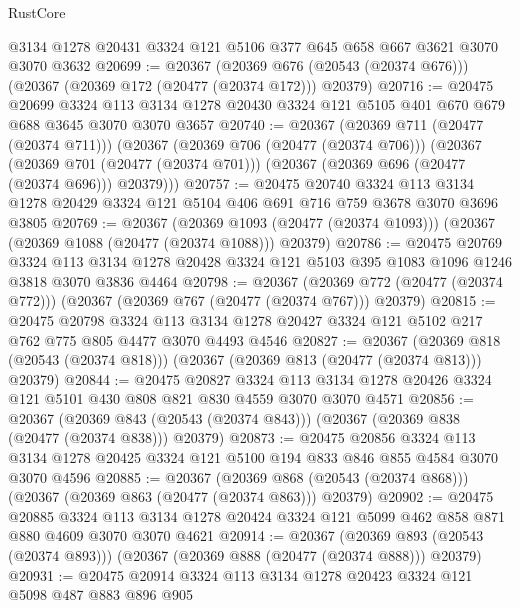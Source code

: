 \begin{lexlean}{RustCore}
\begin{coremodule}
    @3134
    @1278
    @20431
    @3324
    @121
    @5106
    @377
    @645
    @658
    @667
    @3621
    @3070
    @3070
    @3632
@20699 := @20367
    (@20369 @676 (@20543 (@20374 @676)))
    (@20367 (@20369 @172 (@20477 (@20374 @172))) @20379)
@20716 := @20475
    @20699
    @3324
    @113
    @3134
    @1278
    @20430
    @3324
    @121
    @5105
    @401
    @670
    @679
    @688
    @3645
    @3070
    @3070
    @3657
@20740 := @20367
    (@20369 @711 (@20477 (@20374 @711)))
    (@20367
      (@20369 @706 (@20477 (@20374 @706)))
      (@20367
        (@20369 @701 (@20477 (@20374 @701)))
        (@20367 (@20369 @696 (@20477 (@20374 @696))) @20379)))
@20757 := @20475
    @20740
    @3324
    @113
    @3134
    @1278
    @20429
    @3324
    @121
    @5104
    @406
    @691
    @716
    @759
    @3678
    @3070
    @3696
    @3805
@20769 := @20367
    (@20369 @1093 (@20477 (@20374 @1093)))
    (@20367 (@20369 @1088 (@20477 (@20374 @1088))) @20379)
@20786 := @20475
    @20769
    @3324
    @113
    @3134
    @1278
    @20428
    @3324
    @121
    @5103
    @395
    @1083
    @1096
    @1246
    @3818
    @3070
    @3836
    @4464
@20798 := @20367
    (@20369 @772 (@20477 (@20374 @772)))
    (@20367 (@20369 @767 (@20477 (@20374 @767))) @20379)
@20815 := @20475
    @20798
    @3324
    @113
    @3134
    @1278
    @20427
    @3324
    @121
    @5102
    @217
    @762
    @775
    @805
    @4477
    @3070
    @4493
    @4546
@20827 := @20367
    (@20369 @818 (@20543 (@20374 @818)))
    (@20367 (@20369 @813 (@20477 (@20374 @813))) @20379)
@20844 := @20475
    @20827
    @3324
    @113
    @3134
    @1278
    @20426
    @3324
    @121
    @5101
    @430
    @808
    @821
    @830
    @4559
    @3070
    @3070
    @4571
@20856 := @20367
    (@20369 @843 (@20543 (@20374 @843)))
    (@20367 (@20369 @838 (@20477 (@20374 @838))) @20379)
@20873 := @20475
    @20856
    @3324
    @113
    @3134
    @1278
    @20425
    @3324
    @121
    @5100
    @194
    @833
    @846
    @855
    @4584
    @3070
    @3070
    @4596
@20885 := @20367
    (@20369 @868 (@20543 (@20374 @868)))
    (@20367 (@20369 @863 (@20477 (@20374 @863))) @20379)
@20902 := @20475
    @20885
    @3324
    @113
    @3134
    @1278
    @20424
    @3324
    @121
    @5099
    @462
    @858
    @871
    @880
    @4609
    @3070
    @3070
    @4621
@20914 := @20367
    (@20369 @893 (@20543 (@20374 @893)))
    (@20367 (@20369 @888 (@20477 (@20374 @888))) @20379)
@20931 := @20475
    @20914
    @3324
    @113
    @3134
    @1278
    @20423
    @3324
    @121
    @5098
    @487
    @883
    @896
    @905

\end{coremodule}
\end{lexlean}
